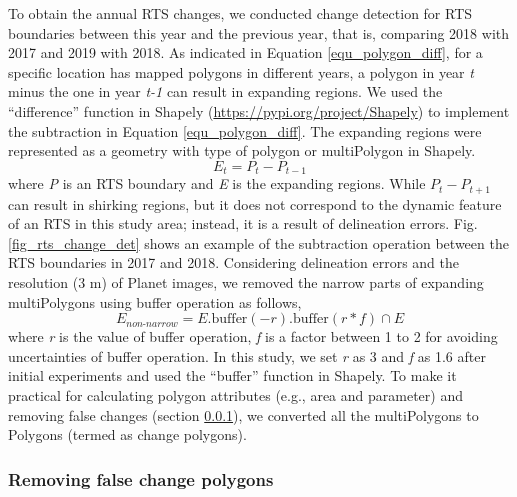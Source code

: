 \documentclass[authoryear,preprint,review,12pt]{elsarticle}
\begin{document}
To obtain the annual RTS changes, we conducted change detection for RTS boundaries between this year and the previous year, that is, comparing 2018 with 2017 and 2019 with 2018. 
 As indicated in Equation \ref{equ_polygon_diff}, for a specific location has mapped polygons in different years, a polygon in year \emph{t} minus the one in year \emph{t-1} can result in expanding regions. 
We used the ``difference'' function in Shapely (\url{https://pypi.org/project/Shapely}) to implement the subtraction in Equation \ref{equ_polygon_diff}. 
The expanding regions were represented as a geometry with type of polygon or multiPolygon  in Shapely.
\begin{equation}
E_{t}= P_{t} - P_{t-1}
\label{equ_polygon_diff}
\end{equation}
where \emph{P} is an RTS boundary and \emph{E} is the expanding regions. 
While $P_{t} - P_{t+1}$ can result in shirking regions, but it does not correspond to the dynamic feature of an RTS in this study area; instead, it is a result of delineation errors. 
Fig. \ref{fig_rts_change_det} shows an example of the subtraction operation between the RTS boundaries in 2017 and 2018. 
Considering delineation errors and the resolution (3 m) of Planet images, we removed the narrow parts of expanding multiPolygons using buffer operation as follows, 
\begin{equation}
E_{non\text{-}narrow}= E.\text{buffer}(-r).\text{buffer}(r*f) \cap E
\label{equ_polygon_buffer}
\end{equation}
where \emph{r} is the value of buffer operation,  \emph{f} is a factor between 1 to 2 for avoiding uncertainties of buffer operation. 
In this study, we set \emph{r} as 3 and \emph{f} as 1.6 after initial experiments and used the ``buffer'' function in Shapely.
To make it practical for calculating polygon attributes (e.g., area and parameter) and removing false changes (section \ref{sec_removing_false_change}), we converted all the multiPolygons to Polygons (termed as change polygons).




\subsubsection{Removing false change polygons}
\label{sec_removing_false_change}
\end{document}
